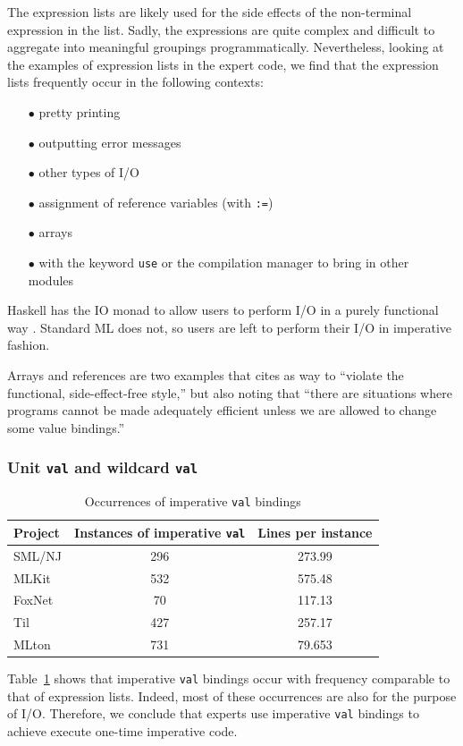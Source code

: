 \documentclass[12pt,abstracton]{scrartcl}
\begin{document}
The expression lists are likely used for the side effects of the non-terminal
expression in the list. Sadly, the expressions are quite complex and difficult
to aggregate into meaningful groupings programmatically. Nevertheless,
looking at the examples of expression lists in the expert code, we find that
the expression lists frequently occur in the following contexts:
\begin{itemize}
\item[$\bullet$] pretty printing
\item[$\bullet$] outputting error messages
\item[$\bullet$] other types of I/O
\item[$\bullet$] assignment of reference variables (with \texttt{:=})
\item[$\bullet$] arrays
\item[$\bullet$] with the keyword \texttt{use} or the compilation manager to bring in other modules
\end{itemize}

Haskell has the IO monad to allow users to perform I/O in a purely functional way \cite{Jon93}.
Standard ML does not, so users are left to perform their
I/O in imperative fashion.

Arrays and references are two examples that \cite{Ull98} cites as way to ``violate the functional,
side-effect-free style,'' but also noting that ``there are situations where programs cannot
be made adequately efficient unless we are allowed to change some value bindings.''
\subsubsection{Unit \texttt{val} and wildcard \texttt{val}}
\begin{table}[h!]
\centering
\begin{tabular}{|l||c|c|}
\hline
Project & Instances of imperative \texttt{val} & Lines per instance \\ \hline\hline
SML/NJ & 296 & 273.99 \\
MLKit & 532 & 575.48 \\
FoxNet & 70 & 117.13 \\
Til & 427 & 257.17 \\
MLton & 731 & 79.653 \\ \hline
\end{tabular}
\caption{Occurrences of imperative \texttt{val} bindings}
\label{table:val}
\end{table}

Table~\ref{table:val} shows that imperative \texttt{val} bindings
occur with frequency comparable to that of expression lists.
Indeed, most of these occurrences are also for the purpose of I/O.
Therefore, we conclude that experts use imperative \texttt{val} bindings
to achieve execute one-time imperative code.
\end{document}
